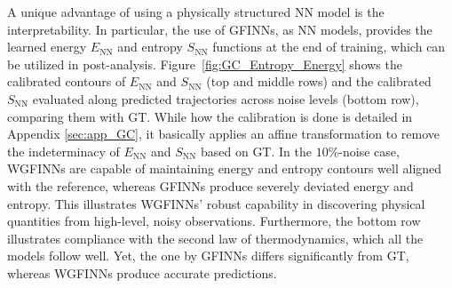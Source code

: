 \documentclass[final]{siamltex}
\begin{document}


A unique advantage of using a physically structured NN model is the interpretability. In particular, the use of GFINNs, as NN models, provides the learned energy $E_{\text{NN}}$ and entropy $S_{\text{NN}}$ functions at the end of training, which can be utilized in post-analysis.
Figure~\ref{fig:GC_Entropy_Energy} shows the calibrated contours of $E_{\text{NN}}$ and $S_{\text{NN}}$ (top and middle rows) and the calibrated $S_{\text{NN}}$ evaluated along predicted trajectories across noise levels (bottom row), comparing 
them with GT. 
While how the calibration is done is detailed in Appendix \ref{sec:app_GC}, it basically applies an affine transformation to remove the indeterminacy of $E_{\text{NN}}$ and $S_{\text{NN}}$ based on GT.
In the $10\%$-noise case, WGFINNs are capable of maintaining energy and entropy contours well aligned 
with the reference, whereas GFINNs produce severely deviated energy and entropy. This illustrates WGFINNs' robust capability in discovering physical quantities from high-level, noisy observations.
Furthermore, the bottom row illustrates compliance with the second law of thermodynamics, which all the models follow well. Yet, the one by GFINNs differs significantly from GT, whereas WGFINNs produce accurate predictions.
\end{document}

